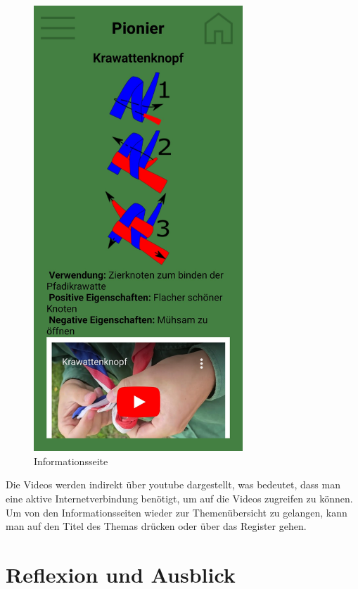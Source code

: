 \begin{figure}[!hp]
\begin{minipage}[b]{0.4\textwidth}
        \includegraphics[width=0.7\textwidth]{Picture/inhaltsseite.jpg}
        \caption{Informationsseite}
        \label{fig:informationsseite}
    \end{minipage}
\end{figure}
Die Videos werden indirekt über youtube dargestellt, was bedeutet, dass man eine aktive Internetverbindung benötigt, um auf die Videos zugreifen zu können. Um von den Informationsseiten wieder zur Themenübersicht zu gelangen, kann man auf den Titel des Themas drücken oder über das Register gehen.
\newpage

\section{Reflexion und Ausblick}

